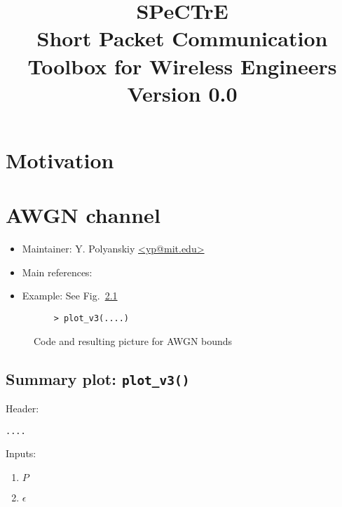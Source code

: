 \documentclass[a4paper,11p]{memoir}
\begin{document}
\title{SPeCTrE\\
Short Packet Communication Toolbox for Wireless Engineers\\[1cm]
Version 0.0}

\maketitle

\begin{abstract}
  
\end{abstract}
\newpage
\tableofcontents

\newpage
\chapter{Motivation}
\chapter{AWGN channel}


\begin{itemize}
\item Maintainer: Y. Polyanskiy \url{<yp@mit.edu>}

\item Main references: \cite{PPV08,PPV10eneff}

\item Example: See Fig.~\ref{fig:awgn_example} 
\end{itemize}


\begin{figure}
\caption{Code and resulting picture for AWGN bounds}\label{fig:awgn_example}
\begin{verbatim}
	> plot_v3(....)
\end{verbatim}
\end{figure}


\cprotect\section{Summary plot: \verb|plot_v3()|}

Header:
\begin{verbatim}
....
\end{verbatim}


Inputs:
\begin{enumerate}
\item $P$
\item $\epsilon$
\end{enumerate}
\end{document}
